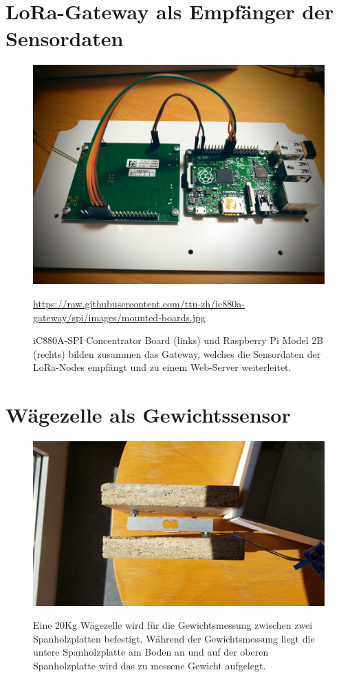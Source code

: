 \section{LoRa-Gateway als Empfänger der Sensordaten}
\begin{figure}[H]
    \center
    \includegraphics[width=15cm]{Bilder/mounted-boards.jpg}\\
    \caption{iC880A-SPI Concentrator Board (links) und Raspberry Pi Model 2B (rechts) bilden zusammen das Gateway, welches die Sensordaten der LoRa-Nodes empfängt und zu einem Web-Server weiterleitet.}
    \begin{flushleft}
        \quelle\url{https://raw.githubusercontent.com/ttn-zh/ic880a-gateway/spi/images/mounted-boards.jpg}
    \end{flushleft}
    \label{fig:UeberblickDerBauteile}
\end{figure}
\newpage
\section{Wägezelle als Gewichtssensor}
\begin{figure}[H]
    \center
    \includegraphics[width=15cm]{Bilder/waegezelle.jpg}\\
    \caption{Eine 20Kg Wägezelle wird für die Gewichtsmessung zwischen zwei Spanholzplatten befestigt. Während der Gewichtsmessung liegt die untere Spanholzplatte am Boden an und auf der oberen Spanholzplatte wird das zu messene Gewicht aufgelegt.}
    \label{fig:Waegezelle}
\end{figure}
\newpage
